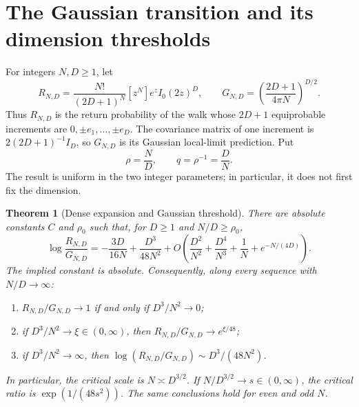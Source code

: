 \documentclass[11pt,letterpaper]{article}
\newtheorem{theorem}{Theorem}[section]
\theoremstyle{remark}\newtheorem{remark}[theorem]{Remark}
\begin{document}

\section{The Gaussian transition and its dimension thresholds}
\label{lcw:ulb:sec:dense-gaussian}

For integers $N,D\ge1$, let
\[
 R_{N,D}=\frac{N!}{(2D+1)^N}[z^N]e^z I_0(2z)^D,
 \qquad
 G_{N,D}=\left(\frac{2D+1}{4\pi N}\right)^{D/2}.
\]
Thus $R_{N,D}$ is the return probability of the walk whose $2D+1$
equiprobable increments are $0,\pm e_1,\ldots,\pm e_D$.
The covariance matrix of one increment is $2(2D+1)^{-1}I_D$, so
$G_{N,D}$ is its Gaussian local-limit prediction. Put
\[
 \rho=\frac ND,\qquad q=\rho^{-1}=\frac DN.
\]
The result is uniform in the two integer parameters; in particular,
it does not first fix the dimension.

\begin{theorem}[Dense expansion and Gaussian threshold]
\label{lcw:ulb:thm:dense-gaussian}
There are absolute constants $C$ and $\rho_0$ such that, for
$D\ge1$ and $N/D\ge\rho_0$,
\begin{equation}\label{lcw:ulb:eq:dense-uniform}
 \log\frac{R_{N,D}}{G_{N,D}}
 =-\frac{3D}{16N}+\frac{D^3}{48N^2}
 +O\left(\frac{D^2}{N^2}+\frac{D^4}{N^3}
               +\frac1N+e^{-N/(4D)}\right).
\end{equation}
The implied constant is absolute. Consequently, along every sequence
with $N/D\to\infty$:
\begin{enumerate}
\item $R_{N,D}/G_{N,D}\to1$ if and only if $D^3/N^2\to0$;
\item if $D^3/N^2\to\xi\in(0,\infty)$, then
      $R_{N,D}/G_{N,D}\to e^{\xi/48}$;
\item if $D^3/N^2\to\infty$, then
      $\log(R_{N,D}/G_{N,D})\sim D^3/(48N^2)$.
\end{enumerate}
In particular, the critical scale is $N\asymp D^{3/2}$.
If $N/D^{3/2}\to s\in(0,\infty)$, the critical ratio is
$\exp(1/(48s^2))$. The same conclusions hold for even and odd $N$.
\end{theorem}
\end{document}
